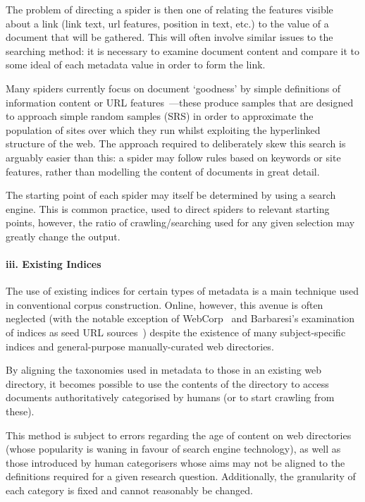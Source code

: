 The problem of directing a spider is then one of relating the features visible about a link (link text, url features, position in text, etc.) to the value of a document that will be gathered.  This will often involve similar issues to the searching method: it is necessary to examine document content and compare it to some ideal of each metadata value in order to form the link.

Many spiders currently focus on document `goodness' by simple definitions of information content or URL features~\cite{schafer2014focused,ferraresi2008introducing,belikov2013big}---these produce samples that are designed to approach simple random samples (SRS) in order to approximate the population of sites over which they run whilst exploiting the hyperlinked structure of the web.  The approach required to deliberately skew this search is arguably easier than this: a spider may follow rules based on keywords or site features, rather than modelling the content of documents in great detail.

The starting point of each spider may itself be determined by using a search engine.  This is common practice, used to direct spiders to relevant starting points, however, the ratio of crawling/searching used for any given selection may greatly change the output.



\paragraph{iii. Existing Indices}
The use of existing indices for certain types of metadata is a main technique used in conventional corpus construction.  Online, however, this avenue is often neglected (with the notable exception of WebCorp~\cite{renouf2003webcorp} and Barbaresi's examination of indices as seed URL sources~\cite{barbaresi2014finding}) despite the existence of many subject-specific indices and general-purpose manually-curated web directories.

By aligning the taxonomies used in metadata to those in an existing web directory, it becomes possible to use the contents of the directory to access documents authoritatively categorised by humans (or to start crawling from these).

This method is subject to errors regarding the age of content on web directories (whose popularity is waning in favour of search engine technology), as well as those introduced by human categorisers whose aims may not be aligned to the definitions required for a given research question.  Additionally, the granularity of each category is fixed and cannot reasonably be changed.


